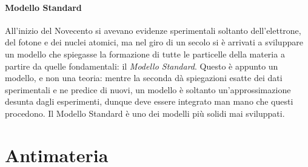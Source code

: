 \paragraph{Modello Standard}

All'inizio del Novecento si avevano evidenze sperimentali soltanto dell'elettrone, del fotone e dei nuclei atomici, ma nel giro di un secolo si è arrivati a sviluppare un modello che spiegasse la formazione di tutte le particelle della materia a partire da quelle fondamentali: il \textit{Modello Standard}. Questo è appunto un modello, e non una teoria: mentre la seconda dà spiegazioni esatte dei dati sperimentali e ne predice di nuovi, un modello è soltanto un'approssimazione desunta dagli esperimenti, dunque deve essere integrato man mano che questi procedono. Il Modello Standard è uno dei modelli più solidi mai sviluppati.

\section{Antimateria}

